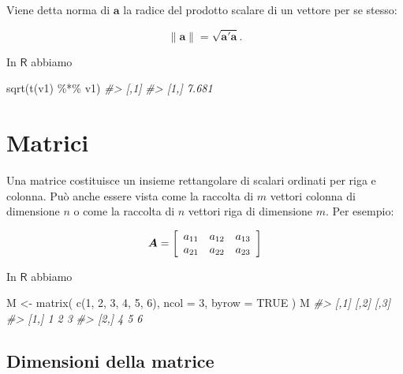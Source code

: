 \documentclass[
  11pt,
]{krantz}
\makeatletter
\newenvironment{Shaded}{\begin{snugshade}}{\end{snugshade}}
\newcommand{\AttributeTok}[1]{\textcolor[rgb]{0.61,0.61,0.61}{#1}}
\newcommand{\CommentTok}[1]{\textcolor[rgb]{0.37,0.37,0.37}{\textit{#1}}}
\newcommand{\ConstantTok}[1]{\textcolor[rgb]{0,0,0}{#1}}
\newcommand{\DecValTok}[1]{\textcolor[rgb]{0.06,0.06,0.06}{#1}}
\newcommand{\FunctionTok}[1]{\textcolor[rgb]{0,0,0}{#1}}
\newcommand{\NormalTok}[1]{#1}
\newcommand{\OtherTok}[1]{\textcolor[rgb]{0.37,0.37,0.37}{#1}}
\newcommand{\SpecialCharTok}[1]{\textcolor[rgb]{0,0,0}{#1}}
\newenvironment{kframe}{%
\medskip{}
\setlength{\fboxsep}{.8em}
 \def\at@end@of@kframe{}%
 \ifinner\ifhmode%
  \def\at@end@of@kframe{\end{minipage}}%
  \begin{minipage}{\columnwidth}%
 \fi\fi%
 \def\FrameCommand##1{\hskip\@totalleftmargin \hskip-\fboxsep
 \colorbox{shadecolor}{##1}\hskip-\fboxsep
     \hskip-\linewidth \hskip-\@totalleftmargin \hskip\columnwidth}%
 \MakeFramed {\advance\hsize-\width
   \@totalleftmargin\z@ \linewidth\hsize
   \@setminipage}}%
 {\par\unskip\endMakeFramed%
 \at@end@of@kframe}
\renewenvironment{Shaded}{\begin{kframe}}{\end{kframe}}
\theoremstyle{definition}
\theoremstyle{definition}
\theoremstyle{definition}
\theoremstyle{definition}
\theoremstyle{remark}
\makeatother
\begin{document}
Viene detta norma di \(\boldsymbol{a}\) la radice del prodotto scalare di un vettore per se stesso:

\[
\| \boldsymbol{a} \| = \sqrt{\boldsymbol{a}'\boldsymbol{a}}.
\]

In \(\mathsf{R}\) abbiamo

\begin{Shaded}
\begin{Highlighting}[]
\FunctionTok{sqrt}\NormalTok{(}\FunctionTok{t}\NormalTok{(v1) }\SpecialCharTok{\%*\%}\NormalTok{ v1)}
\CommentTok{\#\textgreater{}       [,1]}
\CommentTok{\#\textgreater{} [1,] 7.681}
\end{Highlighting}
\end{Shaded}

\hypertarget{matrici}{%
\section{Matrici}\label{matrici}}

Una matrice costituisce un insieme rettangolare di scalari ordinati per riga e colonna. Può anche essere vista come la raccolta di \(m\) vettori colonna di dimensione \(n\) o come la raccolta di \(n\) vettori riga di dimensione \(m\). Per esempio:

\[
\boldsymbol{A} =  \left[ \begin{array}{c c c}
a_{11} & a_{12} & a_{13}\\
a_{21} & a_{22} & a_{23} \end{array} \right]
\]

In \(\mathsf{R}\) abbiamo

\begin{Shaded}
\begin{Highlighting}[]
\NormalTok{M }\OtherTok{\textless{}{-}} \FunctionTok{matrix}\NormalTok{(}
  \FunctionTok{c}\NormalTok{(}\DecValTok{1}\NormalTok{, }\DecValTok{2}\NormalTok{, }\DecValTok{3}\NormalTok{, }\DecValTok{4}\NormalTok{, }\DecValTok{5}\NormalTok{, }\DecValTok{6}\NormalTok{),}
  \AttributeTok{ncol =} \DecValTok{3}\NormalTok{,}
  \AttributeTok{byrow =} \ConstantTok{TRUE}
\NormalTok{)}
\NormalTok{M}
\CommentTok{\#\textgreater{}      [,1] [,2] [,3]}
\CommentTok{\#\textgreater{} [1,]    1    2    3}
\CommentTok{\#\textgreater{} [2,]    4    5    6}
\end{Highlighting}
\end{Shaded}

\hypertarget{dimensioni-della-matrice}{%
\subsection{Dimensioni della matrice}\label{dimensioni-della-matrice}}
\end{document}
